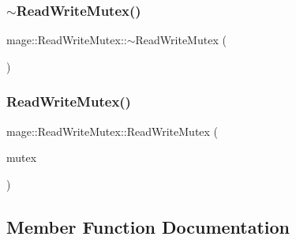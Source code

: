 \hypertarget{classmage_1_1_read_write_mutex_a73676d9414658d63edfe443ee1d55c8b}{}\label{classmage_1_1_read_write_mutex_a73676d9414658d63edfe443ee1d55c8b} 
\subsubsection{\texorpdfstring{$\sim$\+Read\+Write\+Mutex()}{~ReadWriteMutex()}}
{\footnotesize\ttfamily mage\+::\+Read\+Write\+Mutex\+::$\sim$\+Read\+Write\+Mutex (\begin{DoxyParamCaption}{ }\end{DoxyParamCaption})\hspace{0.3cm}{\ttfamily [private]}}

\hypertarget{classmage_1_1_read_write_mutex_ae58b656dabbee6ccad6d0d89b85bf018}{}\label{classmage_1_1_read_write_mutex_ae58b656dabbee6ccad6d0d89b85bf018} 
\subsubsection{\texorpdfstring{Read\+Write\+Mutex()}{ReadWriteMutex()}\hspace{0.1cm}{\footnotesize\ttfamily [2/2]}}
{\footnotesize\ttfamily mage\+::\+Read\+Write\+Mutex\+::\+Read\+Write\+Mutex (\begin{DoxyParamCaption}\item[{\hyperlink{classmage_1_1_read_write_mutex}{Read\+Write\+Mutex} \&}]{mutex }\end{DoxyParamCaption})\hspace{0.3cm}{\ttfamily [private]}}



\subsection{Member Function Documentation}
\hypertarget{classmage_1_1_read_write_mutex_af78045647078aaf3966c8f1b06e35c92}{}\label{classmage_1_1_read_write_mutex_af78045647078aaf3966c8f1b06e35c92} 
